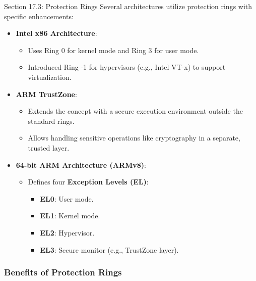 \begin{notes}{Section 17.3: Protection Rings}
    Several architectures utilize protection rings with specific enhancements:
    \begin{itemize}
        \item \textbf{Intel x86 Architecture}:
        \begin{itemize}
            \item Uses Ring 0 for kernel mode and Ring 3 for user mode.
            \item Introduced Ring -1 for hypervisors (e.g., Intel VT-x) to support virtualization.
        \end{itemize}
        \item \textbf{ARM TrustZone}:
        \begin{itemize}
            \item Extends the concept with a secure execution environment outside the standard rings.
            \item Allows handling sensitive operations like cryptography in a separate, trusted layer.
        \end{itemize}
        \item \textbf{64-bit ARM Architecture (ARMv8)}:
        \begin{itemize}
            \item Defines four \textbf{Exception Levels (EL)}:
            \begin{itemize}
                \item \textbf{EL0}: User mode.
                \item \textbf{EL1}: Kernel mode.
                \item \textbf{EL2}: Hypervisor.
                \item \textbf{EL3}: Secure monitor (e.g., TrustZone layer).
            \end{itemize}
        \end{itemize}
    \end{itemize}
    
    \subsubsection*{Benefits of Protection Rings}
    

\end{notes}
